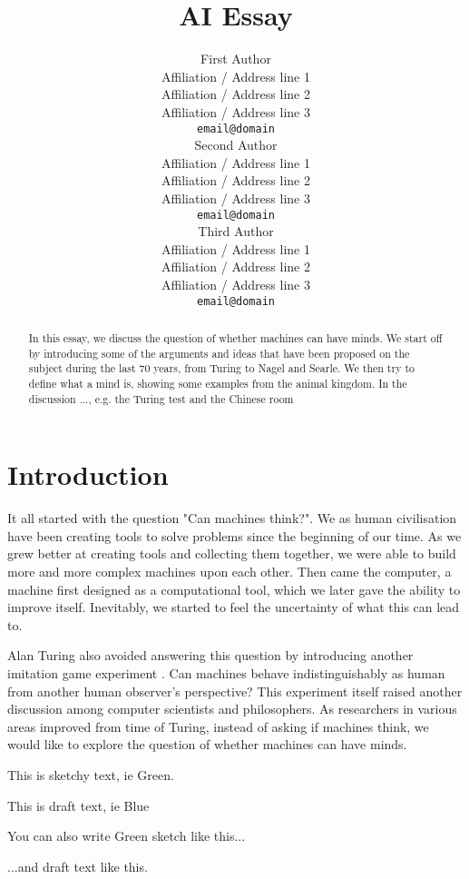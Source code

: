 \documentclass[11pt]{article}
\title{AI Essay}
\author{First Author \\
  Affiliation / Address line 1 \\
  Affiliation / Address line 2 \\
  Affiliation / Address line 3 \\
  {\tt email@domain} \\\And
  Second Author \\
  Affiliation / Address line 1 \\
  Affiliation / Address line 2 \\
  Affiliation / Address line 3 \\
  {\tt email@domain} \\\And
  Third Author \\
  Affiliation / Address line 1 \\
  Affiliation / Address line 2 \\
  Affiliation / Address line 3 \\
  {\tt email@domain} \\}
\date{}
\newcommand{\sk}[1]{{\color{dark-green-2} #1}}
\newcommand{\dr}[1]{{\color{dark-cornflower-blue-2} #1}}
\newenvironment{sketch}{\color{dark-green-2}}{\ignorespacesafterend}
\newenvironment{draft}{\color{dark-cornflower-blue-2}}{\ignorespacesafterend}
\begin{document}
\maketitle
\begin{abstract}
\sk{
In this essay, we discuss the question of whether machines can have minds. We start off by introducing some of the arguments and ideas that have been proposed on the subject during the last 70 years, from Turing to Nagel and Searle. We then try to define what a mind is, showing some examples from the animal kingdom. In the discussion ..., e.g. the Turing test and the Chinese room
}
\end{abstract}

\section{Introduction}
\label{sec:introduction}

\begin{draft}
It all started with the question "Can machines think?". We as human civilisation have been creating tools to solve problems since the beginning of our time. As we grew better at creating tools and collecting them together, we were able to build more and more complex machines upon each other. Then came the computer, a machine first designed as a computational tool, which we later gave the ability to improve itself. Inevitably, we started to feel the uncertainty of what this can lead to.

Alan Turing also  avoided answering this question by introducing another imitation game experiment \cite{turing1950computing}. Can machines behave indistinguishably as human from another human observer's perspective? This experiment itself raised another discussion among computer scientists and philosophers. As researchers in various areas improved from time of Turing, instead of asking if machines think, we would like to explore the question of whether machines can have minds.
\end{draft}


\sk{This is sketchy text, ie Green.}

\dr{This is draft text, ie Blue}

\begin{sketch}
You can also write Green sketch like this...
\end{sketch}

\begin{draft}
...and draft text like this.
\end{draft}
\end{document}
